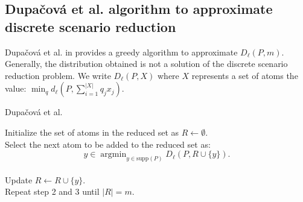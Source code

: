 \documentclass{amsart}
\newcommand{\argmin}{\mathop{\arg\min}}
\begin{document}
\subsection{Dupačová et al. algorithm to approximate discrete scenario reduction}
Dupačová et al. in \cite{dupacova_scenario_2003} provides a greedy algorithm to approximate $D_\ell\left(P,m\right)$. Generally, the distribution obtained is not a solution of the discrete scenario reduction problem. We write $D_\ell\left(P, X\right)$ where $X$ represents a set of atoms the value: $\min_{q}d_\ell\left(P,\sum_{i=1}^{\lvert X\rvert} q_jx_j\right)$.

\begin{algorithm}
  \caption{Dupačová et al.}\label{dupacova}
  Initialize the set of atoms in the reduced set as $R\gets \emptyset.$ \\ Select the next atom to be added to the reduced set as: $$ y\in\argmin_{y\in \text{supp}\left(P\right)}D_\ell\left(P,R\cup\{y\}\right).
  $$ \\
  Update $R\gets R\cup \{y\}$.\\ Repeat step 2 and 3 until $\lvert R\rvert=m$.
\end{algorithm}
\end{document}
